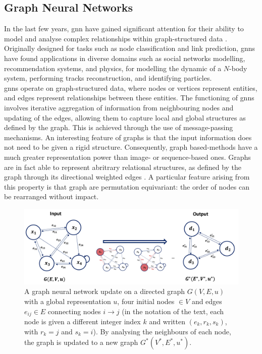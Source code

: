 \subsection{Graph Neural Networks}\label{chapter-GNN}
In the last few years, \gls{gnn} have gained significant attention for their ability to model and analyse complex relationships within graph-structured data \cite{graphNetRef}. Originally designed for tasks such as node classification and link prediction, \gls{gnn}s have found applications in diverse domains such as social networks modelling, recommendation systems, and physics, for modelling the dynamic of a $N$-body system, performing tracks reconstruction, and identifying particles.\\
\gls{gnn}s operate on graph-structured data, where nodes or vertices represent entities, and edges represent relationships between these entities. The functioning of \gls{gnn}s involves iterative aggregation of information from neighbouring nodes and updating of the edges, allowing them to capture local and global structures as defined by the graph. This is achieved through the use of message-passing mechanisms. An interesting feature of graphs is that the input information does not need to be given a rigid structure. Consequently, graph based-methods have a much greater representation power than image- or sequence-based ones. Graphs are in fact able to represent abritrary relational structures, as defined by the graph through its directional weighted edges \cite{graphInductiveBias}. A particular feature arising from this property is that graph are permutation equivariant: the order of nodes can be rearranged without impact. \\

\begin{figure}[h!]
    \center
    \includegraphics[scale=0.5]{Images/ML/gnn.png}
    \caption{A graph neural network update on a directed graph $G(V, E, u)$ with a global representation $u$, four initial nodes $\in V$ and edges $e_{ij} \in E$ connecting nodes $i \rightarrow j$ (in the notation of the text, each node is given a different integer index $k$ and written $(e_k, r_k, s_k)$, with $r_k = j$ and $s_k = i$). By analysing the neighbours of each node, the graph is updated to a new graph $G^*(V^*, E^*, u^*)$.} 
    \label{fig:gnnScheme}
\end{figure}

